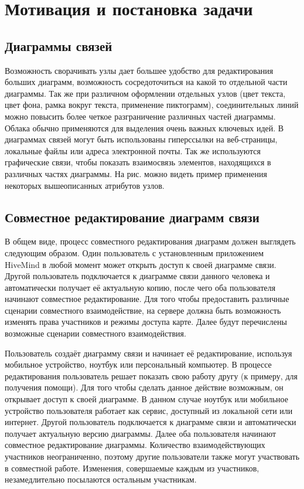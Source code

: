 \newpage

\chapter{Мотивация и постановка задачи}
\label{ch:chapter_1}

\section{Диаграммы связей}

Возможность сворачивать узлы дает большее удобство для редактирования больших
диаграмм, возможность сосредоточиться на какой то отдельной части диаграммы. Так
же при различном оформлении отдельных узлов (цвет текста, цвет фона, рамка
вокруг текста, применение пиктограмм), соединительных линий можно повысить более
четкое разграничение различных частей диаграммы. Облака обычно применяются для
выделения очень важных ключевых идей. В диаграммах связей могут быть
использованы гиперссылки на веб-страницы, локальные файлы или адреса электронной
почты. Так же используются графические связи, чтобы показать взаимосвязь
элементов, находящихся в различных частях диаграммы. На рис. можно видеть пример
применения некоторых вышеописанных атрибутов узлов.


\section{Совместное редактирование диаграмм связи}
\label{sec:collaborative_mindmapping}

В общем виде, процесс совместного редактирования диаграмм должен выглядеть
следующим образом. Один пользователь с установленным приложением HiveMind в
любой момент может открыть доступ к своей диаграмме связи. Другой пользователь
подключается к диаграмме связи данного человека и автоматически получает её
актуальную копию, после чего оба пользователя начинают совместное
редактирование. Для того чтобы предоставить различные сценарии
совместного взаимодействие, на сервере должна быть возможность изменять права
участников и режимы доступа карте. Далее будут перечислены возможные сценарии
совместного взаимодействия.

Пользователь создаёт диаграмму связи и начинает её редактирование, используя
мобильное устройство, ноутбук или персональный компьютер. В процессе
редактирования пользователь решает показать свою работу другу (к примеру, для
получения помощи). Для того чтобы сделать данное действие возможным, он
открывает доступ к своей диаграмме. В данном случае ноутбук или мобильное
устройство пользователя работает как сервис, доступный из локальной сети или
интернет. Другой пользователь подключается к диаграмме связи и автоматически
получает актуальную версию диаграммы. Далее оба пользователя начинают совместное
редактирование диаграммы. Количество взаимодействующих участников неограниченно,
поэтому другие пользователи также могут участвовать в совместной работе.
Изменения, совершаемые каждым из участников, незамедлительно посылаются
остальным участникам.

